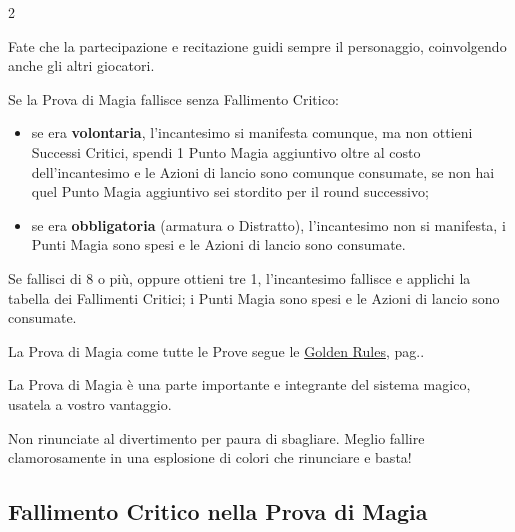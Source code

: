 \begin{multicols}{2}
\begin{narratore}
\medskip

Fate che la partecipazione e recitazione guidi sempre il personaggio, coinvolgendo anche gli altri giocatori.
\end{narratore}

\medskip

Se la Prova di Magia fallisce senza Fallimento Critico:
\begin{itemize}[leftmargin=*] \setlength{\itemsep}{0pt}
\item se era \textbf{volontaria}, l'incantesimo si manifesta comunque, ma non ottieni Successi Critici, spendi 1 Punto Magia aggiuntivo oltre al costo dell'incantesimo e le Azioni di lancio sono comunque consumate, se non hai quel Punto Magia aggiuntivo sei stordito per il round successivo;
\item se era \textbf{obbligatoria} (armatura o Distratto), l'incantesimo non si manifesta, i Punti Magia sono spesi e le Azioni di lancio sono consumate.
\end{itemize}

Se fallisci di 8 o più, oppure ottieni tre 1, l'incantesimo fallisce e applichi la tabella dei Fallimenti Critici; i Punti Magia sono spesi e le Azioni di lancio sono consumate.

La Prova di Magia come tutte le Prove segue le \hyperlink{goldenrules}{Golden Rules}, pag.\pageref{goldenrules}.





\begin{giocatore}
La Prova di Magia è una parte importante e integrante del sistema magico, usatela a vostro vantaggio. %

Non rinunciate al divertimento per paura di sbagliare. Meglio fallire clamorosamente in una esplosione di colori che rinunciare e basta!
\end{giocatore}


\subsection{Fallimento Critico nella Prova di Magia}\label{magiefallimentocriticonellaprovadimagia}\hypertarget{magiefallimentocriticonellaprovadimagia}{}


\end{multicols}
